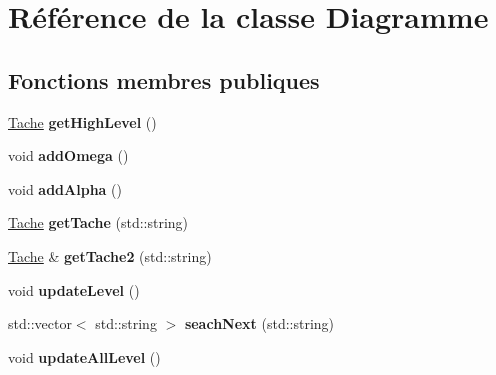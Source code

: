 \hypertarget{class_diagramme}{\section{Référence de la classe Diagramme}
\label{class_diagramme}
}
\subsection*{Fonctions membres publiques}
\begin{DoxyCompactItemize}
\item 
\hypertarget{class_diagramme_abc5f0a52dda91000a1eafbee0c674553}{\hyperlink{class_tache}{Tache} {\bfseries get\-High\-Level} ()}\label{class_diagramme_abc5f0a52dda91000a1eafbee0c674553}

\item 
\hypertarget{class_diagramme_a3e3b871910fe333b9559037cd0bc08fb}{void {\bfseries add\-Omega} ()}\label{class_diagramme_a3e3b871910fe333b9559037cd0bc08fb}

\item 
\hypertarget{class_diagramme_a569ec9824d96bdd6f2443af7abaf6b2f}{void {\bfseries add\-Alpha} ()}\label{class_diagramme_a569ec9824d96bdd6f2443af7abaf6b2f}

\item 
\hypertarget{class_diagramme_aca5e3890ae1af3b605cbb97ba1382b93}{\hyperlink{class_tache}{Tache} {\bfseries get\-Tache} (std\-::string)}\label{class_diagramme_aca5e3890ae1af3b605cbb97ba1382b93}

\item 
\hypertarget{class_diagramme_a8977550a143faba7674b2ecfa5db8b52}{\hyperlink{class_tache}{Tache} \& {\bfseries get\-Tache2} (std\-::string)}\label{class_diagramme_a8977550a143faba7674b2ecfa5db8b52}

\item 
\hypertarget{class_diagramme_a7c4b109cb9af31583b4bec69d352d40e}{void {\bfseries update\-Level} ()}\label{class_diagramme_a7c4b109cb9af31583b4bec69d352d40e}

\item 
\hypertarget{class_diagramme_ad59965f4bfd0d8f8ec3cd0fd97f318bd}{std\-::vector$<$ std\-::string $>$ {\bfseries seach\-Next} (std\-::string)}\label{class_diagramme_ad59965f4bfd0d8f8ec3cd0fd97f318bd}

\item 
\hypertarget{class_diagramme_a95478305e2cfaf830cd19a0b206f4957}{void {\bfseries update\-All\-Level} ()}\label{class_diagramme_a95478305e2cfaf830cd19a0b206f4957}


\end{DoxyCompactItemize}
